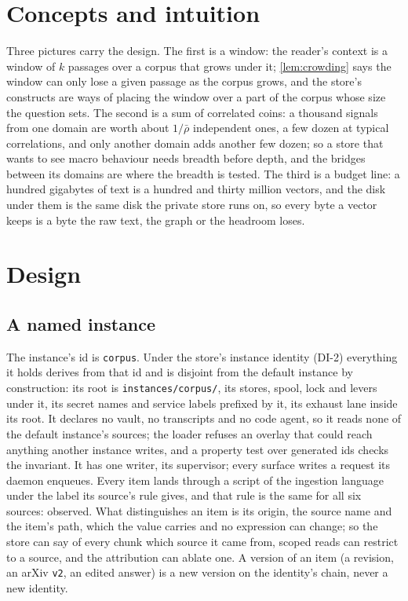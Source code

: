 \documentclass[11pt]{article}
\theoremstyle{plain}
\theoremstyle{definition}
\theoremstyle{remark}
\newcommand{\code}[1]{\texttt{#1}}
\begin{document}
\section{Concepts and intuition}
Three pictures carry the design. The first is a window: the reader's context is a window of $k$
passages over a corpus that grows under it; \cref{lem:crowding} says the window can only lose a
given passage as the corpus grows, and the store's constructs are ways of placing the window over
a part of the corpus whose size the question sets. The second is a sum of correlated coins: a
thousand signals from one domain are worth about $1/\bar\rho$ independent ones, a few dozen at
typical correlations, and only another domain adds another few dozen; so a store that wants to see
macro behaviour needs breadth before depth, and the bridges between its domains are where the
breadth is tested. The third is a budget line: a hundred gigabytes of text is a hundred and thirty
million vectors, and the disk under them is the same disk the private store runs on, so every byte
a vector keeps is a byte the raw text, the graph or the headroom loses.

\section{Design}\label{sec:design}

\subsection{A named instance}
The instance's id is \code{corpus}. Under the store's instance identity (DI-2) everything it holds
derives from that id and is disjoint from the default instance by construction: its root is
\code{instances/corpus/}, its stores, spool, lock and levers under it, its secret names and service
labels prefixed by it, its exhaust lane inside its root. It declares no vault, no transcripts and
no code agent, so it reads none of the default instance's sources; the loader refuses an overlay
that could reach anything another instance writes, and a property test over generated ids checks
the invariant. It has one writer, its supervisor; every surface writes a request its daemon
enqueues. Every item lands through a script of the ingestion language under the label its source's
rule gives, and that rule is the same for all six sources: observed. What distinguishes an item is
its origin, the source name and the item's path, which the value carries and no expression can
change; so the store can say of every chunk which source it came from, scoped reads can restrict
to a source, and the attribution can ablate one. A version of an item (a revision, an arXiv
\code{v2}, an edited answer) is a new version on the identity's chain, never a new identity.
\end{document}
